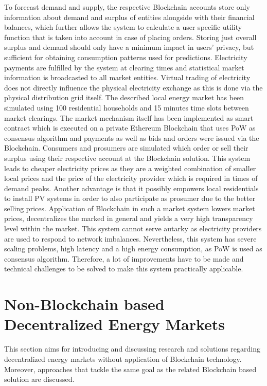 \documentclass[runningheads]{llncs}
\begin{document}
To forecast demand and supply, the respective Blockchain accounts store only information about demand and surplus of entities alongside with their financial balances, which further allows the system to calculate a user specific utility function that is taken into account in case of placing orders. Storing just overall surplus and demand should only have a minimum impact in users’ privacy, but sufficient for obtaining consumption patterns used for predictions. \cite{mengelkamp_lem} \newline
Electricity payments are fulfilled by the system at clearing times and statistical market information is broadcasted to all market entities. Virtual trading of electricity does not directly influence the physical electricity exchange as this is done via the physical distribution grid itself. \newline
The described local energy market has been simulated using 100 residential households and 15 minutes time slots between market clearings. The market mechanism itself has been implemented as smart contract which is executed on a private Ethereum Blockchain that uses PoW as consensus algorithm and payments as well as bids and orders were issued via the Blockchain. Consumers and prosumers are simulated which order or sell their surplus using their respective account at the Blockchain solution. \newline
This system leads to cheaper electricity prices as they are a weighted combination of smaller local prices and the price of the electricity provider which is required in times of demand peaks. Another advantage is that it possibly empowers local residentials to install PV systems in order to also participate as prosumer due to the better selling prices. Application of Blockchain in such a market system lowers market prices, decentralizes the marked in general and yields a very high transparency level within the market. \cite{mengelkamp_lem}\newline
This system cannot serve autarky as electricity providers are used to respond to network imbalances.
Nevertheless, this system has severe scaling problems, high latency and a high energy consumption, as PoW is used as consensus algorithm. Therefore, a lot of improvements have to be made and technical challenges to be solved to make this system practically applicable.

\section{Non-Blockchain based Decentralized Energy Markets}
This section aims for introducing and discussing research and solutions regarding decentralized energy markets without application of Blockchain technology. Moreover, approaches that tackle the same goal as the related Blockchain based solution are discussed.
\end{document}
